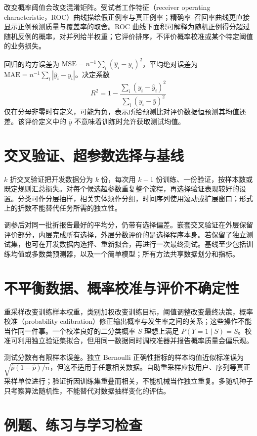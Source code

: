 改变概率阈值会改变混淆矩阵。受试者工作特征（receiver operating characteristic，ROC）曲线描绘假正例率与真正例率；精确率--召回率曲线更直接显示正例预测质量与覆盖率的取舍。ROC 曲线下面积可解释为随机正例得分超过随机反例的概率，对并列给半权重；它评价排序，不评价概率校准或某个特定阈值的业务损失。

回归的均方误差为 $\mathrm{MSE}=n^{-1}\sum_i(\widehat y_i-y_i)^2$，平均绝对误差为 $\mathrm{MAE}=n^{-1}\sum_i|\widehat y_i-y_i|$。决定系数
\[
 R^2=1-\frac{\sum_i(y_i-\widehat y_i)^2}{\sum_i(y_i-\bar y)^2}
\]
仅在分母非零时有定义，可能为负，表示所给预测比对评价数据恒预测其均值还差。该评价定义中的 $\bar y$ 不意味着训练时允许获取测试均值。

\section{交叉验证、超参数选择与基线}

$k$ 折交叉验证把开发数据分为 $k$ 份，每次用 $k-1$ 份训练、一份验证，按样本数或既定规则汇总损失。对每个候选超参数重复整个流程，再选择验证表现较好的设置。分类可作分层抽样，相关实体须作分组，时间序列使用滚动或扩展窗口；形式上的折数不能替代任务所需的独立性。

调参后对同一批折报告最好的平均分，仍带有选择偏差。嵌套交叉验证在外层保留评价部分，内层完成所有选择，外层分数评价的是选择程序本身。若保留了独立测试集，也可在开发数据内选择、重新拟合，再进行一次最终测试。基线至少包括训练均值或多数类预测器，以及一个简单模型；所有方法共享数据划分和指标。

\section{不平衡数据、概率校准与评价不确定性}

重采样改变训练样本权重，类别加权改变训练目标，阈值调整改变最终决策，概率校准（probability calibration）修正输出概率与发生率之间的关系；这些操作不能当作同一件事。一个校准良好的二分类概率 $S$ 理想上满足 $P(Y=1\mid S)=S$。校准可利用独立验证集拟合，但用同一数据同时调校准器并报告概率质量会偏乐观。

测试分数有有限样本误差。独立 Bernoulli 正确性指标的样本均值近似标准误为 $\sqrt{\widehat p(1-\widehat p)/n}$，但这不适用于任意相关数据。自助重采样应按用户、序列等真正采样单位进行；验证折因训练集重叠而相关，不能机械当作独立重复。多随机种子只考察算法随机性，不能替代对数据抽样变化的评估。

\section{例题、练习与学习检查}

